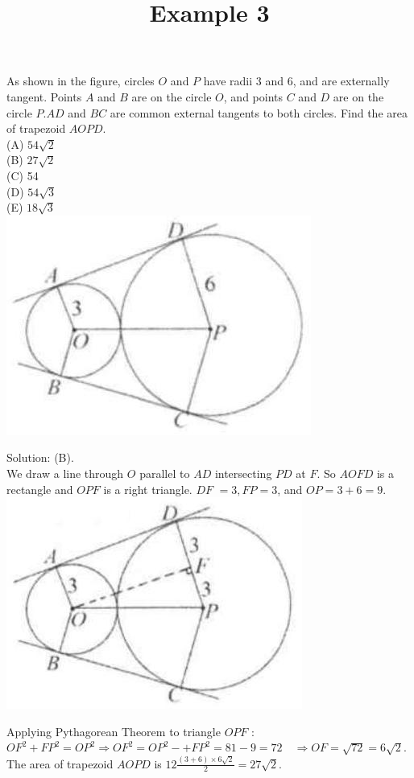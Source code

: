 \documentclass{article}
\title{Example 3}
\date{}
\begin{document}
\maketitle

As shown in the figure, circles \(O\) and \(P\) have radii 3 and 6, and are externally tangent. Points \(A\) and \(B\) are on the circle \(O\), and points \(C\) and \(D\) are on the circle \(P . A D\) and \(B C\) are common external tangents to both circles. Find the area of trapezoid \(A O P D\).\\
(A) \(54 \sqrt{2}\)\\
(B) \(27 \sqrt{2}\)\\
(C) 54\\
(D) \(54 \sqrt{3}\)\\
(E) \(18 \sqrt{3}\)\\
\centering
\includegraphics[width=\textwidth]{images/problem_image_1.jpg}

Solution: (B).\\
We draw a line through \(O\) parallel to \(A D\) intersecting \(P D\) at \(F\). So \(A O F D\) is a rectangle and \(O P F\) is a right triangle. \(D F\) \(=3, F P=3\), and \(O P=3+6=9\).\\
\centering
\includegraphics[width=\textwidth]{images/reasoning_image_1.jpg}

Applying Pythagorean Theorem to triangle \(O P F\) :\\
\(O F^{2}+F P^{2}=O P^{2} \Rightarrow O F^{2}=O P^{2}-+F P^{2}=81-9=72 \quad \Rightarrow O F=\sqrt{72}=6 \sqrt{2}\).\\
The area of trapezoid \(A O P D\) is \(12 \frac{(3+6) \times 6 \sqrt{2}}{2}=27 \sqrt{2}\).
\end{document}
